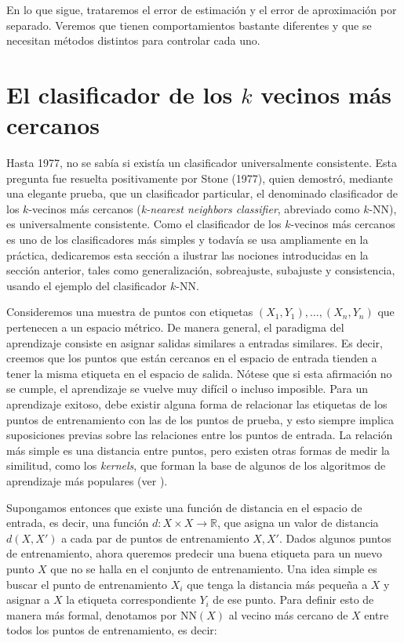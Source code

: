 \documentclass{report}
\begin{document}
En lo que sigue, trataremos el error de estimación y el error de aproximación por separado. Veremos
que tienen comportamientos bastante diferentes y que se necesitan métodos distintos para controlar
cada uno.

\section{El clasificador de los \texorpdfstring{$k$}{k} vecinos más cercanos}

Hasta 1977, no se sabía si existía un clasificador universalmente consistente.
Esta pregunta fue resuelta positivamente por Stone (1977), quien demostró, mediante una elegante prueba,
que un clasificador particular, el denominado clasificador de los \(k\)-vecinos más cercanos
(\textit{k-nearest neighbors classifier}, abreviado como $k$-NN), es universalmente consistente. Como el clasificador de los \(k\)-vecinos
más cercanos es uno de los clasificadores más simples y todavía se usa ampliamente en la práctica,
dedicaremos esta sección a ilustrar las nociones introducidas en la sección anterior, tales como
generalización, sobreajuste, subajuste y consistencia, usando el ejemplo del clasificador \(k\)-NN.

Consideremos una muestra de puntos con etiquetas \((X_1, Y_1), \dots, (X_n, Y_n)\) que
pertenecen a un espacio métrico. De manera general, el paradigma del aprendizaje consiste en asignar salidas
similares a entradas similares. Es decir, creemos que los puntos que están cercanos en el espacio
de entrada tienden a tener la misma etiqueta en el espacio de salida. Nótese que si esta afirmación
no se cumple, el aprendizaje se vuelve muy difícil o incluso imposible. Para un aprendizaje exitoso,
debe existir alguna forma de relacionar las etiquetas de los puntos de entrenamiento con las de los
puntos de prueba, y esto siempre implica suposiciones previas sobre las relaciones entre los puntos
de entrada. La relación más simple es una distancia entre puntos, pero existen otras formas de medir
la similitud, como los \textit{kernels}, que forman la base de algunos de los algoritmos
de aprendizaje más populares (ver \cite{scholkopf1996}).

Supongamos entonces que existe una función de distancia en el espacio de entrada, es decir, una función
\(d : X \times X \to \mathbb{R}\), que asigna un valor de distancia \(d(X, X')\) a cada par de puntos
de entrenamiento \(X, X'\). Dados algunos puntos de entrenamiento, ahora queremos predecir una buena
etiqueta para un nuevo punto \(X\) que no se halla en el conjunto de entrenamiento.
 Una idea simple es buscar el punto de entrenamiento \(X_i\)
que tenga la distancia más pequeña a \(X\) y asignar a \(X\) la etiqueta correspondiente \(Y_i\) de
ese punto. Para definir esto de manera más formal, denotamos por \(\text{NN}(X)\) al vecino más cercano
de \(X\) entre todos los puntos de entrenamiento, es decir:
\end{document}
